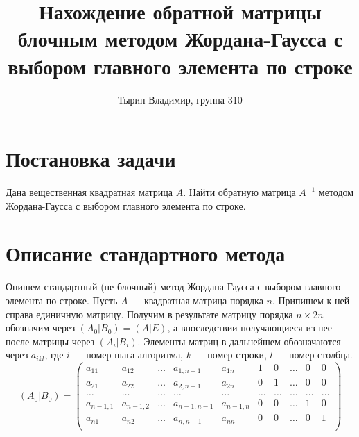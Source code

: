 \documentclass[12pt, russian]{article}
\title{Нахождение обратной матрицы блочным методом Жордана-Гаусса с выбором главного элемента по строке}
\author{Тырин Владимир, группа 310}
\date{}
\begin{document}
\maketitle

\section{Постановка задачи}
Дана вещественная квадратная матрица $A$. Найти обратную матрица $A^{-1}$ методом Жордана-Гаусса с выбором главного элемента по строке.

\section{Описание стандартного метода}

Опишем стандартный (не блочный) метод Жордана-Гаусса с выбором главного элемента по строке.
Пусть $A$ --- квадратная матрица порядка $n$. Припишем к ней справа единичную матрицу. Получим в результате матрицу порядка $n\times 2n$ обозначим через $(A_0|B_0) = (A|E)$, а впоследствии получающиеся из нее после матрицы через $(A_i|B_i)$. Элементы матриц в дальнейшем обозначаются через $a_{ikl}$, где $i$ --- номер шага алгоритма, $k$ --- номер строки, $l$ --- номер столбца.
\[ 
(A_0|B_0) = \left( 
\begin{array} {rrrrr|rrrrr}
a_{11} & a_{12} & \ldots & a_{1,n-1} & a_{1n} & 1 & 0 & \ldots & 0 & 0 \\ 
a_{21} & a_{22} & \ldots & a_{2,n-1} & a_{2n} & 0 & 1 & \ldots & 0 & 0 \\ 
\ldots & \ldots & \ldots & \ldots & \ldots & \ldots & \ldots & \ldots & \ldots & \ldots \\ 
a_{n-1,1} & a_{n-1,2} & \ldots & a_{n-1,n-1} & a_{n-1,n} & 0 & 0 & \ldots & 1 & 0 \\
a_{n1} & a_{n2} & \ldots & a_{n,n-1} & a_{nn} & 0 & 0 & \ldots & 0 & 1 \\ 
\end{array} 
\right) 
\]
\end{document}
